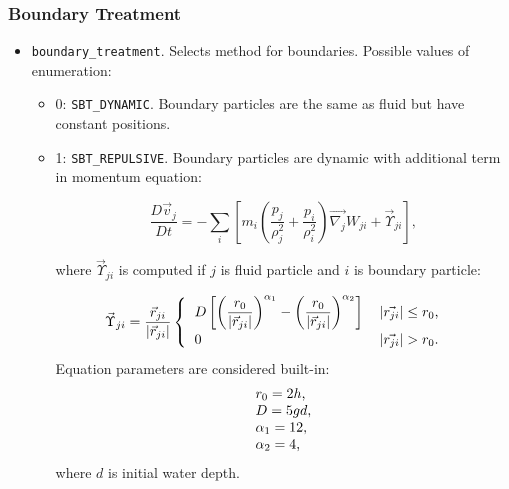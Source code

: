 \subsubsection{Boundary Treatment}
\begin{itemize}
    \item \verb|boundary_treatment|. Selects method for boundaries. Possible values of enumeration:
    \begin{itemize}
        \item 0: \verb|SBT_DYNAMIC|. Boundary particles are the same as fluid but have constant positions.
        \item 1: \verb|SBT_REPULSIVE|. Boundary particles are dynamic with additional term in momentum equation:
        
        \begin{equation}
        \frac{D\vec{v}_j}{D t} = 
        -\sum\limits_{i} 
        \left[
        m_{i} 
        \left(
        \frac{p_{j}}{\rho_{j}^{2}} + 
        \frac{p_{i}}{\rho_{i}^{2}}
        \right) \vec{\nabla_{j}} W_{ji}
        + \vec{\Upsilon}_{ji}
        \right],
        \end{equation}
        
        where $\vec{\Upsilon}_{ji}$ is computed if $j$ is fluid particle and $i$ is boundary particle:
        
        \begin{equation}
        \vec{\Upsilon}_{ji} = 
        \frac{\vec{r}_{ji}}{|\vec{r}_{ji}|}
        \begin{cases}
          \begin{tabular}{l l}
              $\displaystyle{
              D\left[
              \left(
                \frac{r_{0}}{|\vec{r}_{ji}|}
              \right)^{\alpha_{1}}
              -
              \left(
                \frac{r_{0}}{|\vec{r}_{ji}|}
              \right)^{\alpha_{2}}
              \right]
              }$
              &
              $|\vec{r_{ji}}| \leq r_{0}$, 
              
              \\
              
              0
              &
              $|\vec{r_{ji}}| > r_{0}$.
          \end{tabular}  
        \end{cases} 
        \end{equation}
        Equation parameters are considered built-in:
        \begin{equation}
          \begin{tabular}{l}
            $r_{0} = 2h$,
            \\
            $D = 5gd$,
            \\
            $\alpha_{1} = 12$,
            \\
            $\alpha_{2} = 4$,
          \end{tabular}  
        \end{equation}
        where $d$ is initial water depth.
    \end{itemize}
\end{itemize}

